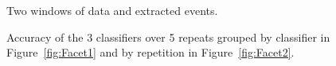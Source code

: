 \documentclass[a4paper,11pt]{article}
\begin{document}
\begin{figure}
	\centering
	\caption{Two windows of data and extracted events.}
	\label{fig:TwoWindows}
\end{figure}


\begin{figure}[!htb]
	\centering
	\caption{Accuracy of the 3 classifiers over 5 repeats grouped by classifier in Figure~\ref{fig:Facet1} and by repetition in Figure~\ref{fig:Facet2}.}
	\label{fig:3Classifiers}
\end{figure}
\end{document}
